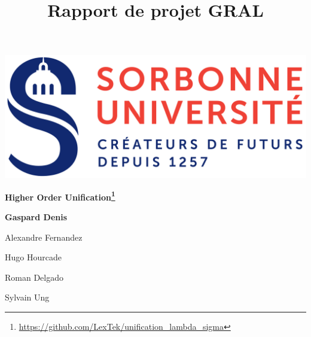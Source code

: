 \begin{titlepage}
\title{Rapport de projet GRAL}
\author{}
\maketitle
\thispagestyle{empty}
\begin{center}
\includegraphics[scale=0.2]{images/logo_sorbonne.png}
\end{center}
\hrulefill
\begin{center}\bfseries\Huge
  Higher Order Unification\footnote{\url{https://github.com/LexTek/unification_lambda_sigma}}
\end{center}
\hrulefill
\vspace*{1cm}
\begin{center}\bfseries\Large
Gaspard Denis

Alexandre Fernandez

Hugo Hourcade

Roman Delgado

Sylvain Ung
\end{center}

\end{titlepage}